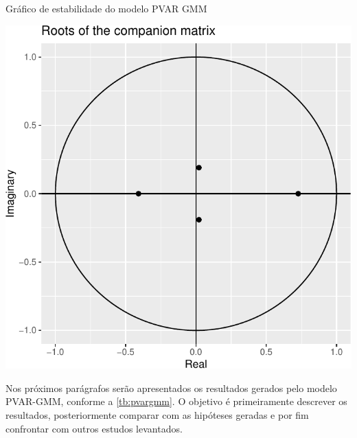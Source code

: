 \documentclass[
  12pt,
  12pt,
  openright,
  oneside,
  a4paper,
  chapter=TITLE,
  section=TITLE,
  subsection=TITLE,
  subsubsection=TITLE,
  portugues,
  sumario=tradicional]{abntex2}
\begin{document}
\begin{grafico}[!hbtp]
\vspace{20pt}
\caption{Gráfico de estabilidade do modelo PVAR GMM}
\vspace{-4mm}

\begin{center}\includegraphics{12-exportedfigures/stability.plot-1} \end{center}
\vspace{-3mm}
\label{graf:stability}
\vspace{-2mm}
\end{grafico}

Nos próximos parágrafos serão apresentados os resultados gerados pelo modelo PVAR-GMM, conforme a \autoref{tb:pvargmm}. O objetivo é primeiramente descrever os resultados, posteriormente comparar com as hipóteses geradas e por fim confrontar com outros estudos levantados.

\vspace{20pt}
\vspace{-2mm}
\linespread{2}
\end{document}
